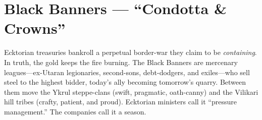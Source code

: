 \section{Black Banners --- ``Condotta \& Crowns''}
\label{chap:black-banners}

\begin{tcolorbox}[colback=black!3,colframe=black!40!white,title={Condotta \& Crowns}]
Ecktorian treasuries bankroll a perpetual border-war they claim to be \emph{containing}. In truth, the gold keeps the fire burning. The Black Banners are mercenary leagues—ex-Utaran legionaries, second-sons, debt-dodgers, and exiles—who sell steel to the highest bidder, today's ally becoming tomorrow's quarry. Between them move the Ykrul steppe-clans (swift, pragmatic, oath-canny) and the Vilikari hill tribes (crafty, patient, and proud). Ecktorian ministers call it ``pressure management.'' The companies call it a season.
\end{tcolorbox}

